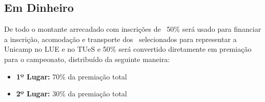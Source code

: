 \subsection{Em Dinheiro}

De todo o montante arrecadado com inscrições de \BasicUnitPl\, 50\% será usado para financiar a inscrição, acomodação e transporte dos \BasicUnitPl\ selecionados para representar a Unicamp no LUE e no TUeS e 50\% será convertido diretamente em premiação para o campeonato, distribuído da seguinte maneira:

\begin{itemize}
    \item \textbf{1º Lugar:} 70\% da premiação total
    \item \textbf{2º Lugar:} 30\% da premiação total
\end{itemize}
